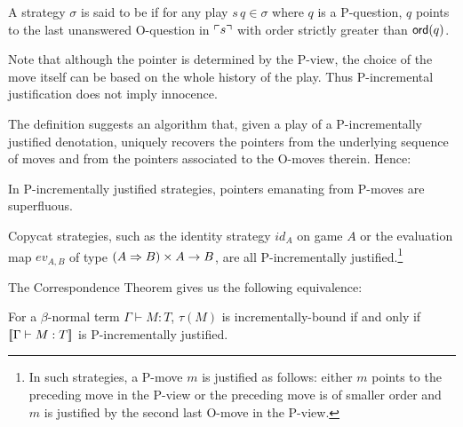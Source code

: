 \begin{definition}\rm
  A strategy $\sigma$ is said to be  if for any play $s \, q \in \sigma$ where $q$ is a
  P-question, $q$ points to the last unanswered O-question in $\ulcorner s \urcorner$ with
  order strictly greater than ${\sf ord}(q)$.
\end{definition}
Note that although the pointer is determined by the P-view, the choice of the move itself
can be based on the whole history of the play. Thus P-incremental justification does not imply innocence.

The definition suggests an algorithm that, given a play of a P-incrementally justified denotation, uniquely recovers the pointers from the underlying sequence of moves and from the pointers associated to the O-moves therein.
Hence:
\begin{lemma}
\label{lem:incrjustified_pointers_uniqu_recover} In P-incrementally justified strategies, pointers emanating from P-moves are superfluous.
\end{lemma}

\begin{example}
Copycat strategies, such as the identity strategy $id_A$ on game $A$ or the evaluation map $ev_{A,B}$ of type $(A \Rightarrow B) \times A \rightarrow B$, are all P-incrementally justified.\footnote{In such strategies, a P-move $m$ is justified as follows: either $m$ points to the preceding move in the P-view or the preceding move is of smaller order and $m$ is justified by the second last O-move in the P-view.}
\end{example}
%




The Correspondence Theorem
gives us the following equivalence:
\begin{proposition} %
\label{prop:incrbound_imp_incrjustified}
For a $\beta$-normal term $\Gamma \vdash M : T$,
$\tau(M)$ is incrementally-bound if and only if ${[\![ \Gamma \vdash M : T ]\!]}$
is P-incrementally justified.
\end{proposition}

